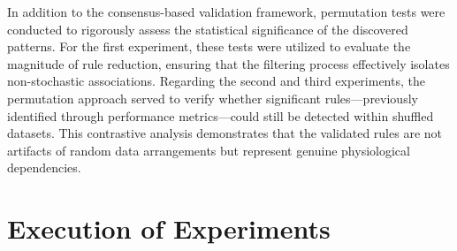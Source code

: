\documentclass{isd}
\begin{document}
{%

In addition to the consensus-based validation framework, permutation tests were conducted to rigorously assess the statistical significance of the discovered patterns. For the first experiment, these tests were utilized to evaluate the magnitude of rule reduction, ensuring that the filtering process effectively isolates non-stochastic associations. Regarding the second and third experiments, the permutation approach served to verify whether significant rules—previously identified through performance metrics—could still be detected within shuffled datasets. This contrastive analysis demonstrates that the validated rules are not artifacts of random data arrangements but represent genuine physiological dependencies.





\section{Execution of Experiments}
\label{sec:experimentsImplementation}

}
\end{document}
